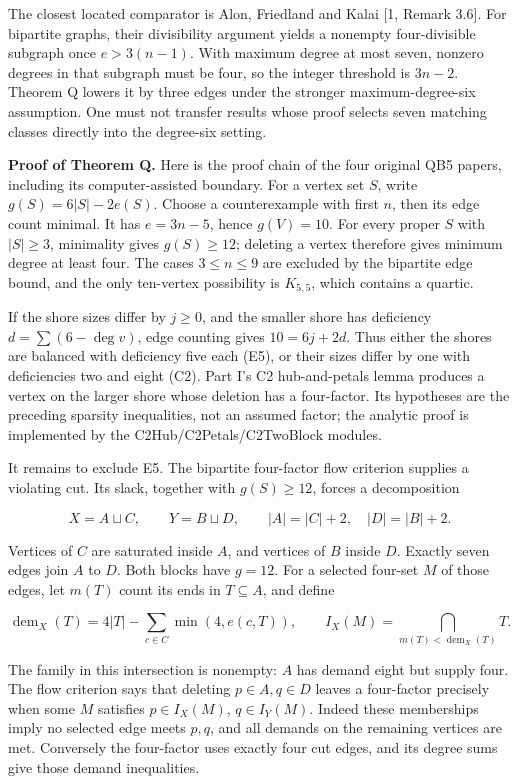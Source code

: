 \documentclass[smallextended]{svjour3}
\newcounter{none} %
\begin{document}
The closest located comparator is Alon, Friedland and Kalai {[}1, Remark
3.6{]}. For bipartite graphs, their divisibility argument yields a
nonempty four-divisible subgraph once \(e>3(n-1)\). With maximum degree
at most seven, nonzero degrees in that subgraph must be four, so the
integer threshold is \(3n-2\). Theorem Q lowers it by three edges under
the stronger maximum-degree-six assumption. One must not transfer
results whose proof selects seven matching classes directly into the
degree-six setting.

\textbf{Proof of Theorem Q.} Here is the proof chain of the four
original QB5 papers, including its computer-assisted boundary. For a
vertex set \(S\), write \(g(S)=6|S|-2e(S)\). Choose a counterexample
with first \(n\), then its edge count minimal. It has \(e=3n-5\), hence
\(g(V)=10\). For every proper \(S\) with \(|S|\ge3\), minimality gives
\(g(S)\ge12\); deleting a vertex therefore gives minimum degree at least
four. The cases \(3\le n\le9\) are excluded by the bipartite edge bound,
and the only ten-vertex possibility is \(K_{5,5}\), which contains a
quartic.

If the shore sizes differ by \(j\ge0\), and the smaller shore has
deficiency \(d=\sum(6-\deg v)\), edge counting gives \(10=6j+2d\). Thus
either the shores are balanced with deficiency five each (E5), or their
sizes differ by one with deficiencies two and eight (C2). Part I's C2
hub-and-petals lemma produces a vertex on the larger shore whose
deletion has a four-factor. Its hypotheses are the preceding sparsity
inequalities, not an assumed factor; the analytic proof is implemented
by the C2Hub/C2Petals/C2TwoBlock modules.

It remains to exclude E5. The bipartite four-factor flow criterion
supplies a violating cut. Its slack, together with \(g(S)\ge12\), forces
a decomposition

\[
X=A\sqcup C,\qquad Y=B\sqcup D,\qquad
|A|=|C|+2,\quad |D|=|B|+2.
\]

Vertices of \(C\) are saturated inside \(A\), and vertices of \(B\)
inside \(D\). Exactly seven edges join \(A\) to \(D\). Both blocks have
\(g=12\). For a selected four-set \(M\) of those edges, let \(m(T)\)
count its ends in \(T\subseteq A\), and define

\[
\operatorname{dem}_X(T)=4|T|-\sum_{c\in C}\min(4,e(c,T)),\qquad
I_X(M)=\bigcap_{m(T)<\operatorname{dem}_X(T)}T.
\]

The family in this intersection is nonempty: \(A\) has demand eight but
supply four. The flow criterion says that deleting \(p\in A,q\in D\)
leaves a four-factor precisely when some \(M\) satisfies
\(p\in I_X(M)\), \(q\in I_Y(M)\). Indeed these memberships imply no
selected edge meets \(p,q\), and all demands on the remaining vertices
are met. Conversely the four-factor uses exactly four cut edges, and its
degree sums give those demand inequalities.
\end{document}
